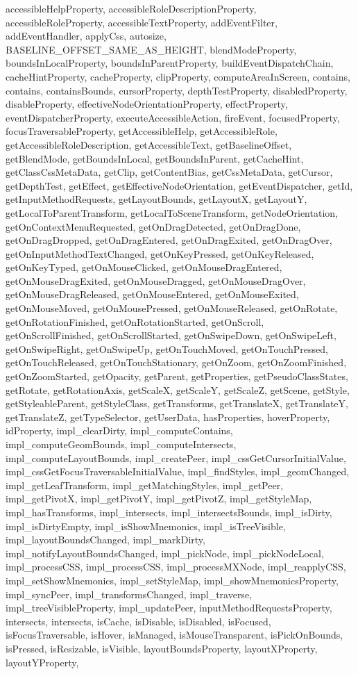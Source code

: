 {{{{{{{{{{{{{{{{{{{{{{{{{{{{{{{{{{{{{{{{{{{{{{{{{{{{{{{{{{{{{accessibleHelpProperty, accessibleRoleDescriptionProperty, accessibleRoleProperty, accessibleTextProperty, addEventFilter, addEventHandler, applyCss, autosize, BASELINE\_OFFSET\_SAME\_AS\_HEIGHT, blendModeProperty, boundsInLocalProperty, boundsInParentProperty, buildEventDispatchChain, cacheHintProperty, cacheProperty, clipProperty, computeAreaInScreen, contains, contains, containsBounds, cursorProperty, depthTestProperty, disabledProperty, disableProperty, effectiveNodeOrientationProperty, effectProperty, eventDispatcherProperty, executeAccessibleAction, fireEvent, focusedProperty, focusTraversableProperty, getAccessibleHelp, getAccessibleRole, getAccessibleRoleDescription, getAccessibleText, getBaselineOffset, getBlendMode, getBoundsInLocal, getBoundsInParent, getCacheHint, getClassCssMetaData, getClip, getContentBias, getCssMetaData, getCursor, getDepthTest, getEffect, getEffectiveNodeOrientation, getEventDispatcher, getId, getInputMethodRequests, getLayoutBounds, getLayoutX, getLayoutY, getLocalToParentTransform, getLocalToSceneTransform, getNodeOrientation, getOnContextMenuRequested, getOnDragDetected, getOnDragDone, getOnDragDropped, getOnDragEntered, getOnDragExited, getOnDragOver, getOnInputMethodTextChanged, getOnKeyPressed, getOnKeyReleased, getOnKeyTyped, getOnMouseClicked, getOnMouseDragEntered, getOnMouseDragExited, getOnMouseDragged, getOnMouseDragOver, getOnMouseDragReleased, getOnMouseEntered, getOnMouseExited, getOnMouseMoved, getOnMousePressed, getOnMouseReleased, getOnRotate, getOnRotationFinished, getOnRotationStarted, getOnScroll, getOnScrollFinished, getOnScrollStarted, getOnSwipeDown, getOnSwipeLeft, getOnSwipeRight, getOnSwipeUp, getOnTouchMoved, getOnTouchPressed, getOnTouchReleased, getOnTouchStationary, getOnZoom, getOnZoomFinished, getOnZoomStarted, getOpacity, getParent, getProperties, getPseudoClassStates, getRotate, getRotationAxis, getScaleX, getScaleY, getScaleZ, getScene, getStyle, getStyleableParent, getStyleClass, getTransforms, getTranslateX, getTranslateY, getTranslateZ, getTypeSelector, getUserData, hasProperties, hoverProperty, idProperty, impl\_clearDirty, impl\_computeContains, impl\_computeGeomBounds, impl\_computeIntersects, impl\_computeLayoutBounds, impl\_createPeer, impl\_cssGetCursorInitialValue, impl\_cssGetFocusTraversableInitialValue, impl\_findStyles, impl\_geomChanged, impl\_getLeafTransform, impl\_getMatchingStyles, impl\_getPeer, impl\_getPivotX, impl\_getPivotY, impl\_getPivotZ, impl\_getStyleMap, impl\_hasTransforms, impl\_intersects, impl\_intersectsBounds, impl\_isDirty, impl\_isDirtyEmpty, impl\_isShowMnemonics, impl\_isTreeVisible, impl\_layoutBoundsChanged, impl\_markDirty, impl\_notifyLayoutBoundsChanged, impl\_pickNode, impl\_pickNodeLocal, impl\_processCSS, impl\_processCSS, impl\_processMXNode, impl\_reapplyCSS, impl\_setShowMnemonics, impl\_setStyleMap, impl\_showMnemonicsProperty, impl\_syncPeer, impl\_transformsChanged, impl\_traverse, impl\_treeVisibleProperty, impl\_updatePeer, inputMethodRequestsProperty, intersects, intersects, isCache, isDisable, isDisabled, isFocused, isFocusTraversable, isHover, isManaged, isMouseTransparent, isPickOnBounds, isPressed, isResizable, isVisible, layoutBoundsProperty, layoutXProperty, layoutYProperty, }}}}}}}}}}}}}}}}}}}}}}}}}}}}}}}}}}}}}}}}}}}}}}}}}}}}}}}}}}}}}
